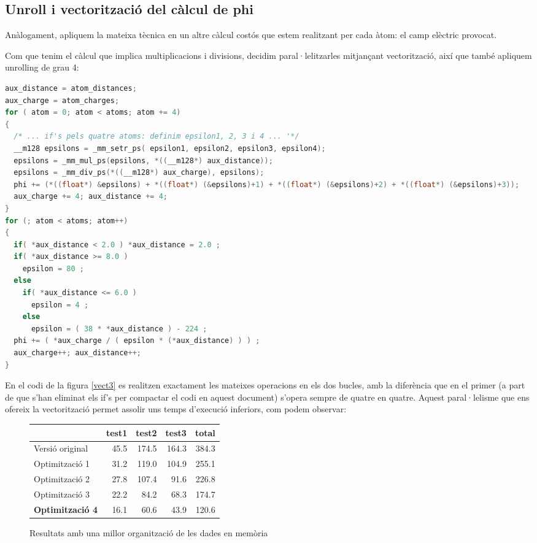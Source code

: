 
\subsection{Unroll i vectorització del càlcul de phi}

Anàlogament, apliquem la mateixa tècnica en un altre càlcul costós que estem realitzant per cada àtom: el camp elèctric provocat.

Com que tenim el càlcul que implica multiplicacions i divisions, decidim paral·lelitzarles mitjançant vectorització, així que també apliquem unrolling de grau 4:

\begin{lstlisting}[label=vect3, caption=Unrolling i vectorització de phi, language=C]
aux_distance = atom_distances;
aux_charge = atom_charges;
for ( atom = 0; atom < atoms; atom += 4)
{
  /* ... if's pels quatre atoms: definim epsilon1, 2, 3 i 4 ... '*/
  __m128 epsilons = _mm_setr_ps( epsilon1, epsilon2, epsilon3, epsilon4);
  epsilons = _mm_mul_ps(epsilons, *((__m128*) aux_distance));
  epsilons = _mm_div_ps(*((__m128*) aux_charge), epsilons);
  phi += (*((float*) &epsilons) + *((float*) (&epsilons)+1) + *((float*) (&epsilons)+2) + *((float*) (&epsilons)+3));
  aux_charge += 4; aux_distance += 4;
}
for (; atom < atoms; atom++)
{
  if( *aux_distance < 2.0 ) *aux_distance = 2.0 ;
  if( *aux_distance >= 8.0 )
    epsilon = 80 ;
  else
    if( *aux_distance <= 6.0 )
      epsilon = 4 ;
    else
      epsilon = ( 38 * *aux_distance ) - 224 ;
  phi += ( *aux_charge / ( epsilon * (*aux_distance) ) ) ;
  aux_charge++; aux_distance++;
}
\end{lstlisting}

En el codi de la figura \ref{vect3} es realitzen exactament les mateixes operacions en els dos bucles, amb la diferència que en el primer (a part de que s'han eliminat els if's per compactar el codi en aquest document) s'opera sempre de quatre en quatre. Aquest paral·lelisme que ens ofereix la vectorització permet assolir uns temps d'execució inferiors, com podem observar:


\begin{figure}[ht]
  \caption{Resultats amb una millor organització de les dades en memòria}\label{fig:elapsed_4}
  \begin{center}
    \begin{tabular}{ l r r r r }
      & test1 & test2 & test3 & total \\
      \hline
      Versió original & 45.5 & 174.5 & 164.3 & 384.3 \\
      Optimització 1 & 31.2 & 119.0 & 104.9 & 255.1 \\
      Optimització 2 & 27.8 & 107.4 & 91.6 & 226.8 \\
      Optimització 3 & 22.2 & 84.2 & 68.3 & 174.7 \\
      \textbf{Optimització 4} & 16.1 & 60.6 & 43.9 & 120.6 \\
    \end{tabular}
  \end{center}
\end{figure}

